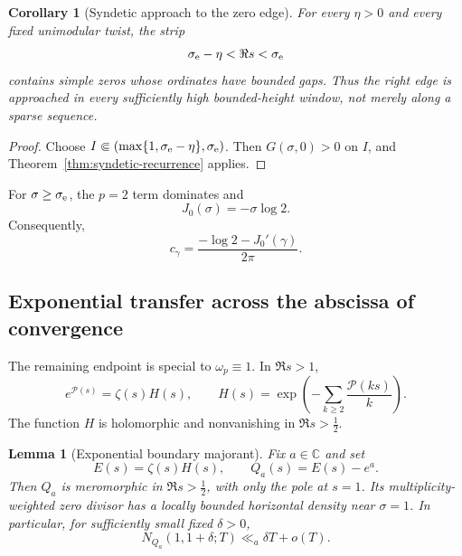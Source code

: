 \documentclass[11pt]{article}
\newtheorem{lemma}[theorem]{Lemma}
\newtheorem{corollary}[theorem]{Corollary}
\theoremstyle{definition}
\theoremstyle{remark}
\newcommand{\cP}{\mathcal P}
\newcommand{\C}{\mathbb C}
\begin{document}
\begin{corollary}[Syndetic approach to the zero edge]
\label{cor:edge-recurrence}
For every $\eta>0$ and every fixed unimodular twist, the strip
\[
 \sigma_{\rm e}-\eta<\Re s<\sigma_{\rm e}
\]
contains simple zeros whose ordinates have bounded gaps.  Thus the right edge is
approached in every sufficiently high bounded-height window, not merely along a sparse
sequence.
\end{corollary}

\begin{proof}
Choose $I\Subset(\max\{1,\sigma_{\rm e}-\eta\},\sigma_{\rm e})$.
Then $G(\sigma,0)>0$ on $I$, and Theorem~\ref{thm:syndetic-recurrence} applies.
\end{proof}

For $\sigma\ge\sigma_{\rm e}$, the $p=2$ term dominates and
\[
 J_0(\sigma)=-\sigma\log2.
\tag{4.9}
\]
Consequently,
\[
 c_\gamma=\frac{-\log2-J_0'(\gamma)}{2\pi}.
\tag{4.10}
\]

\subsection{Exponential transfer across the abscissa of convergence}

The remaining endpoint is special to $\omega_p\equiv1$.  In $\Re s>1$,
\[
 e^{\cP(s)}=\zeta(s)H(s),
 \qquad
 H(s)=\exp\!\left(-\sum_{k\ge2}\frac{\cP(ks)}k\right).
\tag{4.11}
\]
The function $H$ is holomorphic and nonvanishing in $\Re s>\tfrac12$.

\begin{lemma}[Exponential boundary majorant]
\label{lem:boundary-majorant}
Fix $a\in\C$ and set
\[
 E(s)=\zeta(s)H(s),\qquad Q_a(s)=E(s)-e^a.
\]
Then $Q_a$ is meromorphic in $\Re s>\tfrac12$, with only the pole at $s=1$.
Its multiplicity-weighted zero divisor has a locally bounded horizontal density near
$\sigma=1$.  In particular, for sufficiently small fixed $\delta>0$,
\[
 N_{Q_a}(1,1+\delta;T)\ll_a\delta T+o(T).
\tag{4.12}
\]
\end{lemma}
\end{document}
